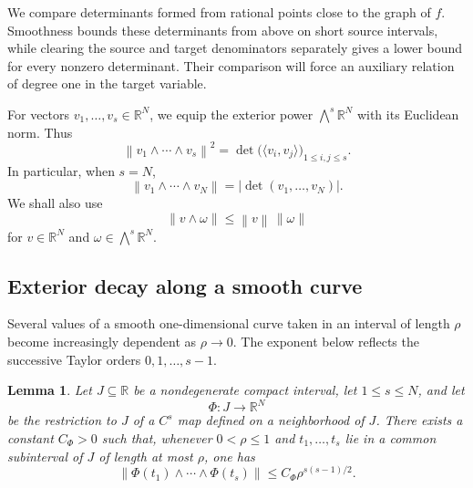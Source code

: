 \documentclass[11pt]{amsart}
\numberwithin{equation}{section}
\newtheorem{lemma}[lemma]{Lemma}
\theoremstyle{definition}
\theoremstyle{remark}
\newcommand{\R}{\mathbb R}
\newcommand{\norm}[1]{\left\lVert #1\right\rVert}
\newcommand{\abs}[1]{\left\lvert #1\right\rvert}
\begin{document}
We compare determinants formed from rational points close to
the graph of $f$. Smoothness bounds these determinants from
above on short source intervals, while clearing the source and
target denominators separately gives a lower bound for every
nonzero determinant. Their comparison will force an auxiliary
relation of degree one in the target variable.

For vectors $v_1,\ldots,v_s\in\R^N$, we equip the exterior power
$\bigwedge^s\R^N$ with its Euclidean norm. Thus
\[
\norm{v_1\wedge\cdots\wedge v_s}^2
=
\det\bigl(\langle v_i,v_j\rangle\bigr)_{1\leq i,j\leq s}.
\]
In particular, when $s=N$,
\[
\norm{v_1\wedge\cdots\wedge v_N}
=
\abs{\det(v_1,\ldots,v_N)}.
\]
We shall also use
\[
\norm{v\wedge\omega}\leq\norm{v}\,\norm{\omega}
\]
for $v\in\R^N$ and $\omega\in\bigwedge^s\R^N$.

\subsection{Exterior decay along a smooth curve}

Several values of a smooth one-dimensional curve taken in an interval
of length $\rho$ become increasingly dependent as $\rho\to0$. The
exponent below reflects the successive Taylor orders
$0,1,\ldots,s-1$.

\begin{lemma}\label{lem:wedge-curve-en}
Let $J\subseteq\R$ be a nondegenerate compact interval, let
$1\leq s\leq N$, and let
\[
\Phi:J\longrightarrow\R^N
\]
be the restriction to $J$ of a $C^s$ map defined on a neighborhood of
$J$. There exists a constant $C_\Phi>0$ such that, whenever
$0<\rho\leq1$ and $t_1,\ldots,t_s$ lie in a common subinterval of $J$
of length at most $\rho$, one has
\begin{equation}\label{eq:wedge-bound-en}
\norm{\Phi(t_1)\wedge\cdots\wedge\Phi(t_s)}
\leq C_\Phi\rho^{s(s-1)/2}.
\end{equation}
\end{lemma}
\end{document}
